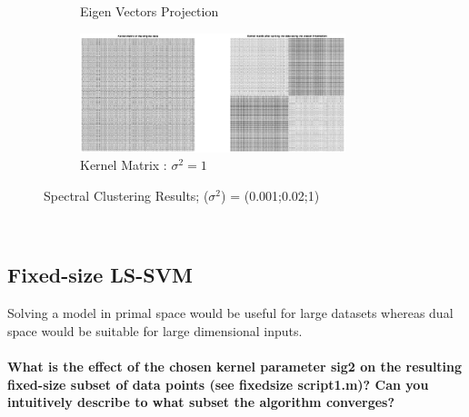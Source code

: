 \begin{figure}[ht]
\begin{subfigure}[b]{0.32\textwidth}
		\caption{Eigen Vectors Projection}\label{fig:sclust_sig_1_1}
	\end{subfigure}%
	\begin{subfigure}[b]{0.32\textwidth}
		\centering
		\includegraphics[height= 0.55\textwidth, width = 0.85\textwidth]{Exercise3/Report/sclust_sig_1_2}
		\caption{Kernel Matrix : $\sigma^2 = 1$}\label{fig:sclust_sig_1_2}
	\end{subfigure}
	\caption{Spectral Clustering Results; ($\sigma^2$) = (0.001;0.02;1) }
	\label{fig:sclust}
\end{figure}\\
\subsection{Fixed-size LS-SVM}
Solving a model in primal space would be useful for large datasets whereas dual space would be suitable for large dimensional inputs. \\\\ 
\textbf{What is the effect of the chosen kernel parameter sig2 on the resulting fixed-size subset of data points (see fixedsize script1.m)? Can you intuitively describe to what subset the algorithm converges?}

